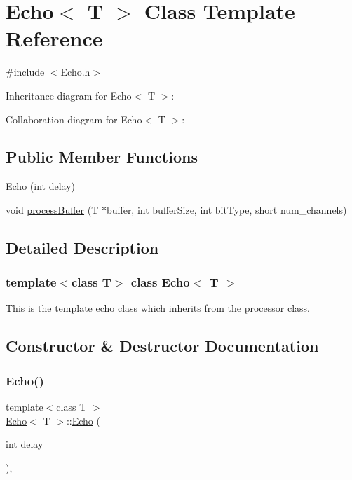 \hypertarget{classEcho}{}\section{Echo$<$ T $>$ Class Template Reference}
\label{classEcho}


{\ttfamily \#include $<$Echo.\+h$>$}



Inheritance diagram for Echo$<$ T $>$\+:


Collaboration diagram for Echo$<$ T $>$\+:
\subsection*{Public Member Functions}
\begin{DoxyCompactItemize}
\item 
\hyperlink{classEcho_af348cd7f23248e72046c5d006d3adca7}{Echo} (int delay)
\item 
void \hyperlink{classEcho_a2519b0af7621b4c3bb3b685a5a1886a8}{process\+Buffer} (T $\ast$buffer, int buffer\+Size, int bit\+Type, short num\+\_\+channels)
\end{DoxyCompactItemize}


\subsection{Detailed Description}
\subsubsection*{template$<$class T$>$\newline
class Echo$<$ T $>$}

This is the template echo class which inherits from the processor class. 

\subsection{Constructor \& Destructor Documentation}
\mbox{\label{classEcho_af348cd7f23248e72046c5d006d3adca7}} 
\subsubsection{\texorpdfstring{Echo()}{Echo()}}
{\footnotesize\ttfamily template$<$class T $>$ \\
\hyperlink{classEcho}{Echo}$<$ T $>$\+::\hyperlink{classEcho}{Echo} (\begin{DoxyParamCaption}\item[{int}]{delay }\end{DoxyParamCaption})\hspace{0.3cm}{\ttfamily [inline]}, {\ttfamily [explicit]}}

